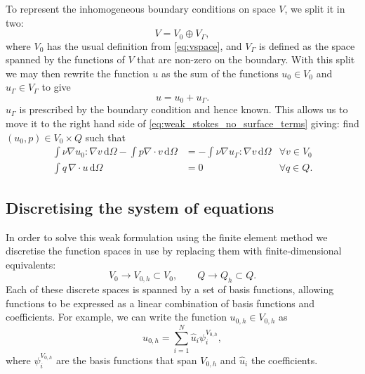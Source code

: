 \documentclass[thesis]{subfiles}
\begin{document}
To represent the inhomogeneous boundary conditions on space $V$, we split it in two:
\begin{equation}
  V = V_0 \oplus V_\Gamma,
\end{equation}
where $V_0$ has the usual definition from \cref{eq:vspace}, and $V_\Gamma$ is defined as the space spanned by the functions of $V$ that are non-zero on the boundary.
With this split we may then rewrite the function $u$ as the sum of the functions $u_0 \in V_0$ and $u_\Gamma \in V_\Gamma$ to give
\begin{equation}
  u = u_0 + u_\Gamma.
\end{equation}
$u_\Gamma$ is prescribed by the boundary condition and hence known.
This allows us to move it to the right hand side of \cref{eq:weak_stokes_no_surface_terms} giving: find $(u_0, p) \in V_0 \times Q$ such that
\begin{equation} \label{eq:weak_stokes}
  \begin{aligned}
    \int \nu \nabla u_0 : \nabla v \, \textrm{d}\Omega
    - \int p \nabla \cdot v \, \textrm{d}\Omega
    &=
    - \int \nu \nabla u_\Gamma : \nabla v \, \textrm{d}\Omega
    &\forall v \in V_0 \\
    \int q \, \nabla \cdot u \, \textrm{d}\Omega
    &= 0
    &\forall q \in Q.
  \end{aligned}
\end{equation}

\subsection{Discretising the system of equations}

In order to solve this weak formulation using the finite element method we discretise the function spaces in use by replacing them with finite-dimensional equivalents:
\begin{equation}
  V_0 \to V_{0,h} \subset V_0,
  \quad
  \quad
  Q \to Q_h \subset Q.
\end{equation}
Each of these discrete spaces is spanned by a set of basis functions, allowing functions to be expressed as a linear combination of basis functions and coefficients.
For example, we can write the function $u_{0,h} \in V_{0,h}$ as
\begin{equation}
  u_{0,h} = \sum^N_{i=1} \hat u_i \psi^{V_{0,h}}_i,
\end{equation}
where $\psi^{V_{0,h}}_i$ are the basis functions that span $V_{0,h}$ and $\hat u_i$ the coefficients.
\end{document}
